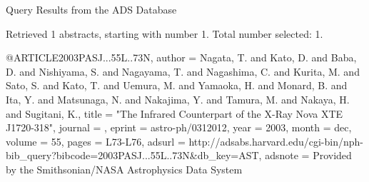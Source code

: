 Query Results from the ADS Database


Retrieved 1 abstracts, starting with number 1.  Total number selected: 1.

@ARTICLE{2003PASJ...55L..73N,
   author = {{Nagata}, T. and {Kato}, D. and {Baba}, D. and {Nishiyama}, S. and 
	{Nagayama}, T. and {Nagashima}, C. and {Kurita}, M. and {Sato}, S. and 
	{Kato}, T. and {Uemura}, M. and {Yamaoka}, H. and {Monard}, B. and 
	{Ita}, Y. and {Matsunaga}, N. and {Nakajima}, Y. and {Tamura}, M. and 
	{Nakaya}, H. and {Sugitani}, K.},
    title = "{The Infrared Counterpart of the X-Ray Nova XTE J1720-318}",
  journal = {\pasj},
   eprint = {astro-ph/0312012},
     year = 2003,
    month = dec,
   volume = 55,
    pages = {L73-L76},
   adsurl = {http://adsabs.harvard.edu/cgi-bin/nph-bib_query?bibcode=2003PASJ...55L..73N&db_key=AST},
  adsnote = {Provided by the Smithsonian/NASA Astrophysics Data System}
}


